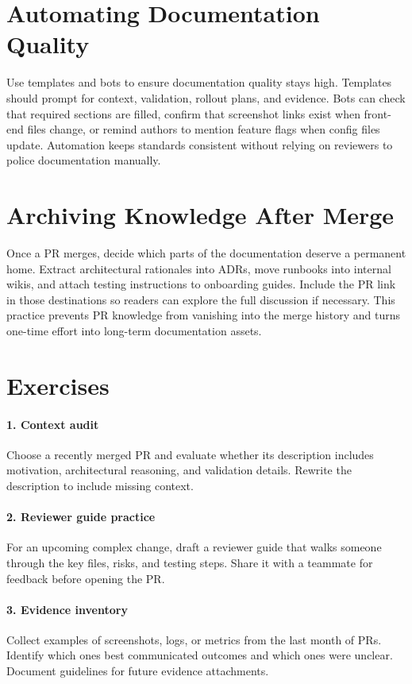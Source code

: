 \section{Automating Documentation Quality}
Use templates and bots to ensure documentation quality stays high. Templates should prompt for context, validation, rollout plans, and evidence. Bots can check that required sections are filled, confirm that screenshot links exist when front-end files change, or remind authors to mention feature flags when config files update. Automation keeps standards consistent without relying on reviewers to police documentation manually.

\section{Archiving Knowledge After Merge}
Once a PR merges, decide which parts of the documentation deserve a permanent home. Extract architectural rationales into ADRs, move runbooks into internal wikis, and attach testing instructions to onboarding guides. Include the PR link in those destinations so readers can explore the full discussion if necessary. This practice prevents PR knowledge from vanishing into the merge history and turns one-time effort into long-term documentation assets.

\section*{Exercises}

\paragraph{1. Context audit} Choose a recently merged PR and evaluate whether its description includes motivation, architectural reasoning, and validation details. Rewrite the description to include missing context.

\paragraph{2. Reviewer guide practice} For an upcoming complex change, draft a reviewer guide that walks someone through the key files, risks, and testing steps. Share it with a teammate for feedback before opening the PR.

\paragraph{3. Evidence inventory} Collect examples of screenshots, logs, or metrics from the last month of PRs. Identify which ones best communicated outcomes and which ones were unclear. Document guidelines for future evidence attachments.

